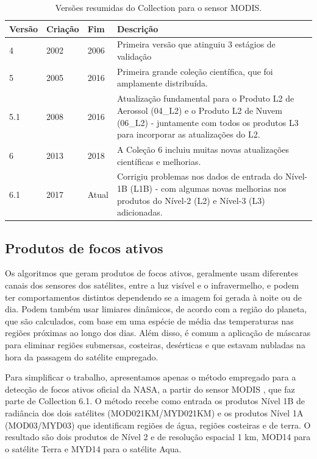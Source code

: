 \documentclass[cic,tc]{iiufrgs}
\begin{document}
\begin{table}[!htb]
\centering
\caption{Versões resumidas do Collection para o sensor MODIS.}
\begin{tabular}{ @{}lllp{10cm}@{} }
  \toprule
  \textbf{Versão} & \textbf{Criação} & \textbf{Fim} & \textbf{Descrição} \\
  \midrule
  4   & 2002 & 2006  & Primeira versão que atinguiu 3 estágios de validação \\
  5   & 2005 & 2016  & Primeira grande coleção científica, que foi amplamente distribuída. \\
  5.1 & 2008 & 2016  & Atualização fundamental para o Produto L2 de Aerossol (04\_L2) e o Produto L2 de Nuvem (06\_L2) - juntamente com todos os produtos L3 para incorporar as atualizações do L2. \\
  6   & 2013 & 2018  & A Coleção 6 incluiu muitas novas atualizações científicas e melhorias. \\
  6.1 & 2017 & Atual & Corrigiu problemas nos dados de entrada do Nível-1B (L1B) - com algumas novas melhorias nos produtos do Nível-2 (L2) e Nível-3 (L3) adicionadas. \\
  \bottomrule
\end{tabular}
\label{table:versoes_collection}
\end{table}

\subsection*{Produtos de focos ativos}

Os algoritmos que geram produtos de focos ativos, geralmente usam diferentes canais dos sensores dos satélites, entre a luz visível e o infravermelho, e podem ter comportamentos distintos dependendo se a imagem foi gerada à noite ou de dia. Podem também usar limiares dinâmicos, de acordo com a região do planeta, que são calculados, com base em uma espécie de média das temperaturas nas regiões próximas ao longo dos dias. Além disso, é comum a aplicação de máscaras para eliminar regiões submersas, costeiras, desérticas e que estavam nubladas na hora da passagem do satélite empregado.

Para simplificar o trabalho, apresentamos apenas o método empregado para a detecção de focos ativos oficial da NASA, a partir do sensor MODIS \citep{GIGLIO2016}, que faz parte de Collection 6.1. O método recebe como entrada os produtos Nível 1B de radiância dos dois satélites (MOD021KM/MYD021KM) e os produtos Nível 1A (MOD03/MYD03) que identificam regiões de água, regiões costeiras e de terra. O resultado são dois produtos de Nível 2 e de resolução espacial 1 km, MOD14 para o satélite Terra e MYD14 para o satélite Aqua.
\end{document}
